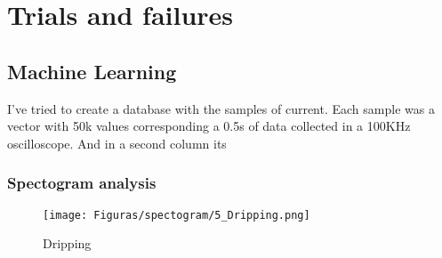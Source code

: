 \chapter{Trials and failures}

\section{Machine Learning}

I've tried to create a database with the samples of current. Each sample was a vector with 50k values corresponding a 0.5s of data collected in a 100KHz oscilloscope. And in a second column its 



\subsection{Spectogram analysis}

\begin{figure}[H]
    \center
    \texttt{[image: Figuras/spectogram/5\_Dripping.png]}
    \label{fig:spectrogram1}
    \caption{Dripping}
  \end{figure}

  
